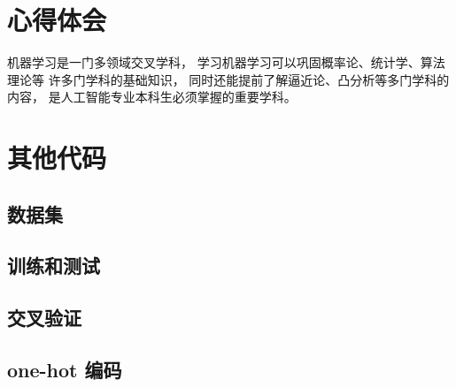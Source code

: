 \documentclass[cn,hazy,blue,14pt,normal]{elegantnote}
\begin{document}
\section{心得体会}
机器学习是一门多领域交叉学科，
学习机器学习可以巩固概率论、统计学、算法理论等
许多门学科的基础知识，
同时还能提前了解逼近论、凸分析等多门学科的内容，
是人工智能专业本科生必须掌握的重要学科。

\appendix
\section{其他代码}
\subsection{数据集}

\subsection{训练和测试}


\subsection{交叉验证}


\subsection{one-hot 编码}

\end{document}
